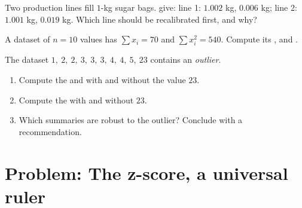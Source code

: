 \begin{exercise}[$\star\star$]\label{exo:g11:stat:8}
Two production lines fill $1$-kg sugar bags.  give:
line 1:  $1.002$ kg,  $0.006$ kg; line 2: 
$1.001$ kg,  $0.019$ kg. Which line should be
recalibrated first, and why?
\end{exercise}

\begin{exercise}[$\star\star$]\label{exo:g11:stat:9}
A dataset of $n = 10$ values has $\sum x_i = 70$ and
$\sum x_i^2 = 540$. Compute its ,  and .
\end{exercise}

\begin{exercise}[$\star\star\star$]\label{exo:g11:stat:10}
The dataset $1,\ 2,\ 2,\ 3,\ 3,\ 3,\ 4,\ 4,\ 5,\ 23$ contains an
\emph{outlier}.
\begin{enumerate}
  \item Compute the  and  with and without the value $23$.
  \item Compute the  with and without $23$.
  \item Which summaries are robust to the outlier? Conclude with a
        recommendation.
\end{enumerate}
\end{exercise}

\section{Problem: The z-score, a universal ruler}

